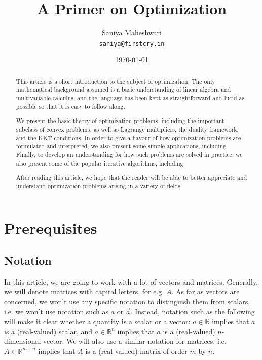 \documentclass[a4paper]{article}
\theoremstyle{definition}
\begin{document}
\title{A Primer on Optimization}
\author{Saniya Maheshwari \\ \texttt{saniya@firstcry.in}}
\date{\today}
\maketitle

\begin{abstract}
	This article is a short introduction to the subject of optimization.
	The only mathematical background assumed is a basic understanding of linear algebra and multivariable calculus, and the language has been kept as straightforward and lucid as possible so that it is easy to follow along.

	We present the basic theory of optimization problems, including the important subclass of convex problems, as well as Lagrange multipliers, the duality framework, and the KKT conditions.
	In order to give a flavour of how optimization problems are formulated and interpreted, we also present some simple applications, including %
	Finally, to develop an understanding for how such problems are solved in practice, we also present some of the popular iterative algorithms, including %

	After reading this article, we hope that the reader will be able to better appreciate and understand optimization problems arising in a variety of fields.
\end{abstract}

\section{Prerequisites}

\subsection{Notation}

In this article, we are going to work with a lot of vectors and matrices.
Generally, we will denote matrices with capital letters, for e.g. $A$.
As far as vectors are concerned, we won't use any specific notation to distinguish them from scalars, i.e. we won't use notation such as $\bar{a}$ or $\vec{a}$.
Instead, notation such as the following will make it clear whether a quantity is a scalar or a vector: $a \in \mathbb{R}$ implies that $a$ is a (real-valued) scalar, and $a \in \mathbb{R}^n$ implies that $a$ is a (real-valued) $n$-dimensional vector.
We will also use a similar notation for matrices, i.e. $A \in \mathbb{R}^{m \times n}$ implies that $A$ is a (real-valued) matrix of order $m$ by $n$.
\end{document}
